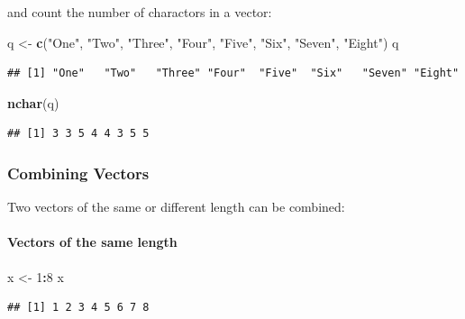 \documentclass[]{book}
\newenvironment{Shaded}{\begin{snugshade}}{\end{snugshade}}
\newcommand{\DecValTok}[1]{\textcolor[rgb]{0.00,0.00,0.81}{#1}}
\newcommand{\KeywordTok}[1]{\textcolor[rgb]{0.13,0.29,0.53}{\textbf{#1}}}
\newcommand{\NormalTok}[1]{#1}
\newcommand{\OperatorTok}[1]{\textcolor[rgb]{0.81,0.36,0.00}{\textbf{#1}}}
\newcommand{\StringTok}[1]{\textcolor[rgb]{0.31,0.60,0.02}{#1}}
\let\oldparagraph\paragraph
\renewcommand{\paragraph}[1]{\oldparagraph{#1}\mbox{}}
\theoremstyle{definition}
\theoremstyle{definition}
\theoremstyle{definition}
\theoremstyle{remark}
\begin{document}
and count the number of charactors in a vector:

\begin{Shaded}
\begin{Highlighting}[]
\NormalTok{q <-}\StringTok{ }\KeywordTok{c}\NormalTok{(}\StringTok{"One"}\NormalTok{, }\StringTok{"Two"}\NormalTok{, }\StringTok{"Three"}\NormalTok{, }\StringTok{"Four"}\NormalTok{, }\StringTok{"Five"}\NormalTok{, }\StringTok{"Six"}\NormalTok{, }\StringTok{"Seven"}\NormalTok{, }\StringTok{"Eight"}\NormalTok{)}
\NormalTok{q}
\end{Highlighting}
\end{Shaded}

\begin{verbatim}
## [1] "One"   "Two"   "Three" "Four"  "Five"  "Six"   "Seven" "Eight"
\end{verbatim}

\begin{Shaded}
\begin{Highlighting}[]
\KeywordTok{nchar}\NormalTok{(q)}
\end{Highlighting}
\end{Shaded}

\begin{verbatim}
## [1] 3 3 5 4 4 3 5 5
\end{verbatim}

\hypertarget{combining-vectors}{%
\subsubsection{Combining Vectors}\label{combining-vectors}}

Two vectors of the same or different length can be combined:

\hypertarget{vectors-of-the-same-length}{%
\paragraph{Vectors of the same
length}\label{vectors-of-the-same-length}}

\begin{Shaded}
\begin{Highlighting}[]
\NormalTok{x <-}\StringTok{ }\DecValTok{1}\OperatorTok{:}\DecValTok{8}
\NormalTok{x}
\end{Highlighting}
\end{Shaded}

\begin{verbatim}
## [1] 1 2 3 4 5 6 7 8
\end{verbatim}
\end{document}
